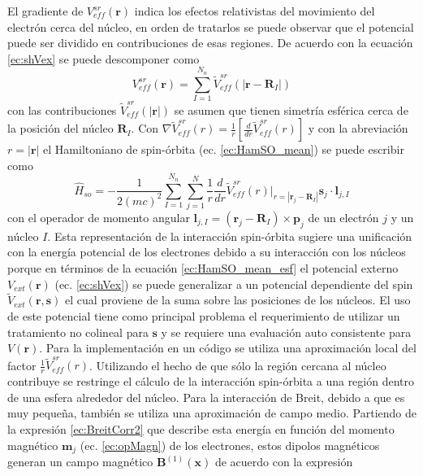 \documentclass[12pt,a4paper, oneside]{book}
\begin{document}
    El gradiente de $V_{eff}^{sr} (\pmb{r})$ indica los efectos relativistas del movimiento del electr\'on cerca del n\'ucleo, en  orden de tratarlos se puede observar que el potencial puede ser dividido en contribuciones de esas regiones. De acuerdo con la ecuaci\'on \ref{ec:shVex}  se puede descomponer como
    \begin{equation}
    V_{eff}^{sr} (\pmb{r}) = \sum_{I=1}^{N_n} \tilde{V}_{eff}^{sr} (|\pmb{r}- \pmb{R}_I|) \label{ec:descVeffSR}
    \end{equation}  
    con las contribuciones $\tilde{V}_{eff}^{sr} (|\pmb{r}|)$ se asumen que tienen simetr\'ia esf\'erica cerca de la posici\'on del n\'ucleo $\pmb{R}_I$. Con $\nabla  \tilde{V}_{eff}^{sr} (r) = \frac{1}{r} \left[\frac{d}{dr} \tilde{V}_{eff}^{sr} (r) \right]$ y con la abreviaci\'on $r = |\pmb{r}|$ el Hamiltoniano de spin-\'orbita (ec. \ref{ec:HamSO_mean}) se puede escribir como
    \begin{equation}
    \hat{H}_{so} =- \frac{1}{2 (mc)^2} \sum_{I=1}^{N_n} \sum_{j=1}^N \frac{1}{r} \frac{d}{dr} \tilde{V}_{eff}^{sr} (r) |_{r=|\pmb{r}_j -\pmb{R}_I|} \pmb{s}_j \cdot \pmb{l}_{j,I}  \label{ec:HamSO_mean_esf}
    \end{equation}
    con el operador de momento angular $\pmb{l}_{j,I} = (\pmb{r}_j - \pmb{R}_I) \times \pmb{p}_j$ de un electr\'on $j$ y un n\'ucleo $I$. Esta representaci\'on de la interacci\'on spin-\'orbita sugiere una unificaci\'on con la energ\'ia potencial de los electrones debido a su interacci\'on con los n\'ucleos porque en t\'erminos de la ecuaci\'on \ref{ec:HamSO_mean_esf} el potencial externo  $V_{ext} (\pmb{r}) $ (ec. \ref{ec:shVex}) se puede generalizar a un potencial dependiente del spin $\tilde{V}_{ext} (\pmb{r}, \pmb{s})$ el cual proviene de la suma sobre las posiciones de los n\'ucleos. El uso de este potencial tiene como principal problema el requerimiento de utilizar un tratamiento no colineal para $\pmb{s}$ y se requiere una evaluaci\'on auto consistente para $V(\pmb{r})$. Para la implementaci\'on en un c\'odigo se utiliza una aproximaci\'on local del factor $\frac{1}{r} \tilde{V}_{eff}^{sr} (r) $. Utilizando el hecho de que s\'olo la regi\'on cercana al n\'ucleo contribuye se restringe el c\'alculo de  la interacci\'on spin-\'orbita a una regi\'on dentro de una esfera alrededor del n\'ucleo.
    \newline
    Para la interacci\'on de Breit, debido a que es muy peque\~na, tambi\'en se utiliza una aproximaci\'on de campo medio. Partiendo de la expresi\'on  \ref{ec:BreitCorr2} que describe esta energ\'ia en funci\'on del momento magn\'etico $\pmb{m}_j$ (ec. \ref{ec:opMagn}) de los electrones, estos dipolos magn\'eticos generan un campo magn\'etico $\pmb{B}^{(1)} (\pmb{x}) $ de acuerdo con la expresi\'on
\end{document}
